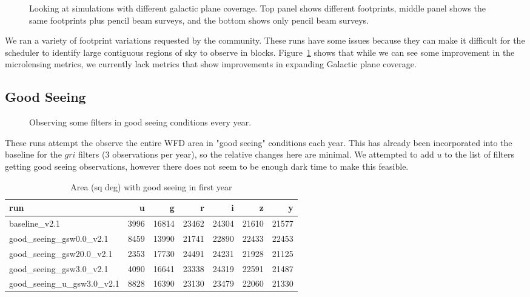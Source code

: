 \begin{figure}
\caption{Looking at simulations with different galactic plane coverage. Top panel shows different footprints, middle panel shows the same footprints plus pencil beam surveys, and the bottom shows only pencil beam surveys. \label{fig:gal_plane_radar}}
\end{figure}


We ran a variety of footprint variations requested by the community. These runs have some issues because they can make it difficult for the scheduler to identify large contiguous regions of sky to observe in blocks. Figure~\ref{fig:gal_plane_radar} shows that while we can see some improvement in the microlensing metrics, we currently lack metrics that show improvements in expanding Galactic plane coverage.



\subsection{Good Seeing}


\begin{figure}
\caption{Observing some filters in good seeing conditions every year. }
\end{figure}


These runs attempt the observe the entire WFD area in "good seeing" conditions each year. This has already been incorporated into the baseline for the $gri$ filters (3 observations per year), so the relative changes here are minimal. We attempted to add $u$ to the list of filters getting good seeing observations, however there does not seem to be enough dark time to make this feasible.


\begin{table}
\caption{Area (sq deg) with good seeing in first year}
\begin{tabular}{lrrrrrr}
                      run &    u &     g &     r &     i &     z &     y \\
                      \hline
            baseline\_v2.1 & 3996 & 16814 & 23462 & 24304 & 21610 & 21577 \\
  good\_seeing\_gsw0.0\_v2.1 & 8459 & 13990 & 21741 & 22890 & 22433 & 22453 \\
 good\_seeing\_gsw20.0\_v2.1 & 2353 & 17730 & 24491 & 24231 & 21928 & 21125 \\
  good\_seeing\_gsw3.0\_v2.1 & 4090 & 16641 & 23338 & 24319 & 22591 & 21487 \\
good\_seeing\_u\_gsw3.0\_v2.1 & 8828 & 16390 & 23130 & 23479 & 22060 & 21330 \\
\end{tabular}
\end{table}


